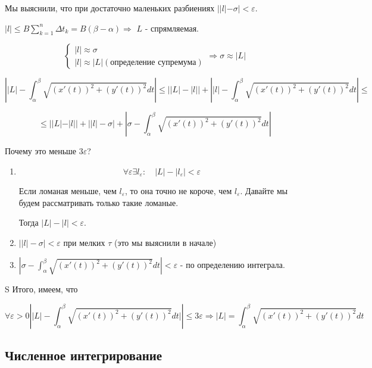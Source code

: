 \documentclass[a4paper]{article}
\begin{document}
\begin{definit}
\begin{hproof}
Мы выяснили, что при достаточно маленьких разбиениях $||l|-\sigma| < \varepsilon$.


$|l| \leq B \sum_{k=1}^n \Delta t_k = B(\beta - \alpha) \Rightarrow$ $L$ - спрямляемая.

\[
\begin{cases}
|l| \approx \sigma \\
|l| \approx |L| (\text{определение супремума})
\end{cases} \Rightarrow \sigma \approx |L|
\]

\[
\left| |L| - \int_{\alpha}^{\beta} \sqrt{(x'(t))^2+(y'(t))^2} dt \right| \leq \left| |L| - |l| \right| + \left| |l| - \int_{\alpha}^{\beta} \sqrt{(x'(t))^2+(y'(t))^2} dt \right| \leq
\]

\[
\leq ||L|-|l|| + \left| |l| - \sigma \right| + \left| \sigma - \int_{\alpha}^{\beta}  \sqrt{(x'(t))^2+(y'(t))^2} dt \right|
\]

Почему это меньше $3\varepsilon$?

\begin{enumerate}
\item \[
\forall \varepsilon \exists l_{\varepsilon}: \quad |L| -|l_{\varepsilon}| < \varepsilon
\]

Если ломаная меньше, чем $l_{\varepsilon}$, то она точно не короче, чем $l_{\varepsilon}$. Давайте мы будем рассматривать только такие ломаные.

Тогда $|L| - |l| < \varepsilon$.
\item $\left| |l| - \sigma \right| < \varepsilon$ при мелких $\tau$ (это мы выяснили в начале)
\item $\left| \sigma - \int_{\alpha}^{\beta}  \sqrt{(x'(t))^2+(y'(t))^2} dt \right| < \varepsilon$ - по определению интеграла.

\end{enumerate}
S
Итого, имеем, что 

\[
\forall \varepsilon > 0 \left| |L| -  \int_{\alpha}^{\beta}  \sqrt{(x'(t))^2+(y'(t))^2} dt| \right| \leq 3\varepsilon \Rightarrow |L| = \int_{\alpha}^{\beta}  \sqrt{(x'(t))^2+(y'(t))^2} dt
\]

\end{hproof}

\end{definit}

\hypertarget{p21}{}
\subsection*{Численное интегрирование}
 
\end{document}
